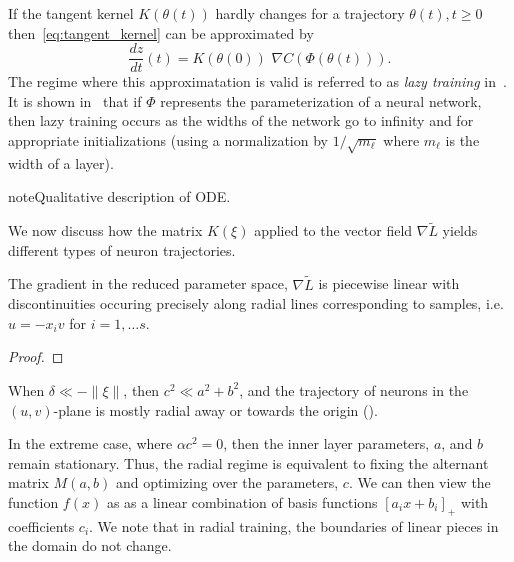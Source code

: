 \begin{remark} If the tangent kernel $K(\theta(t))$ hardly changes for a trajectory $\theta(t), t \ge 0$ then~\eqref{eq:tangent_kernel} can be approximated by
\begin{equation}
    \frac{d z}{dt}(t) = K(\theta(0)) \,\, \nabla C (\Phi(\theta(t))).
\end{equation}
The regime where this approximatation is valid is referred to as \emph{lazy training} in~\cite{chizat2018note}. It is shown in~\cite{NTKJacot} that if $\Phi$ represents the parameterization of a neural network, then lazy training occurs as the widths of the network go to infinity and for appropriate initializations (using a normalization by $1/\sqrt{m_\ell}$ where $m_\ell$ is the width of a layer). 
\end{remark}

note{Qualitative description of ODE.}



We now discuss how the matrix $K(\xi)$ applied to the vector field $\nabla \tilde{L}$ yields different types of neuron trajectories.

\begin{lemma}\label{le:pw_continuous}
The gradient in the reduced parameter space, $\nabla \tilde{L}$ is piecewise linear with discontinuities occuring precisely along radial lines corresponding to samples, i.e. $u = -x_i v$ for $i = 1, \ldots s$.
\end{lemma}

\begin{proof}
\end{proof}



When $\delta \ll -\|\xi\|$, then $c^2 \ll a^2 + b^2$, and the trajectory of neurons in the $(u, v)$-plane is mostly radial away or towards the origin ().

In the extreme case, where $\alpha c^2 = 0$, then the inner layer parameters, $a$, and $b$ remain stationary. Thus, the radial regime is equivalent to fixing the alternant matrix $M(a, b)$ and optimizing over the parameters, $c$. We can then view the function $f(x)$ as as a linear combination of basis functions $[a_i x + b_i]_+$ with coefficients $c_i$. We note that in radial training, the boundaries of linear pieces in the domain do not change. 

